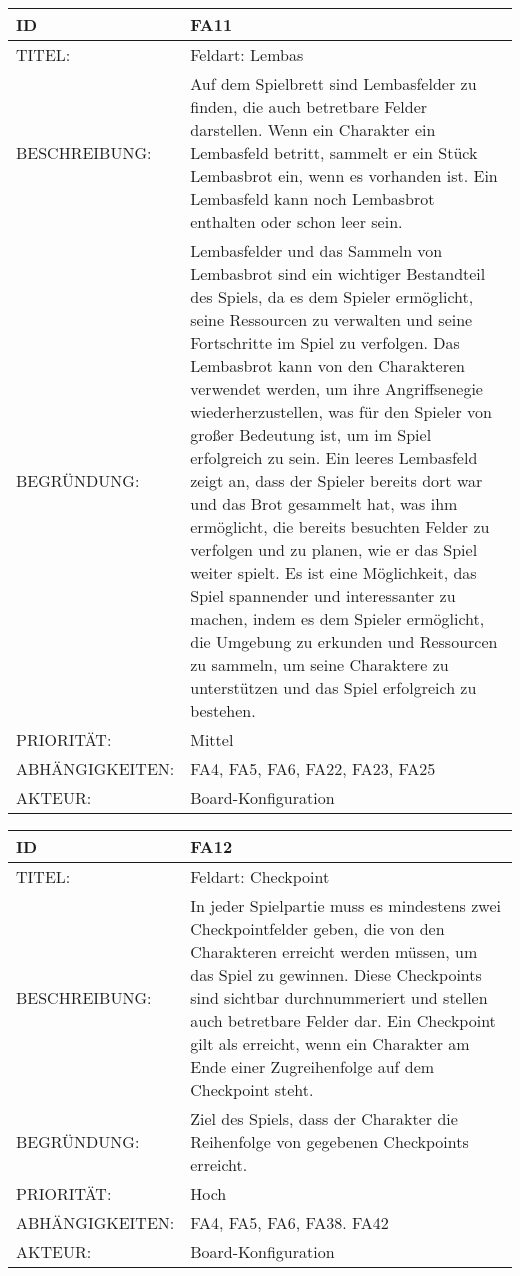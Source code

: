 \documentclass{uulm-assignment}
\begin{document}
    \begin{tabularx}{\textwidth}{|l|X |} \hline
        \textbf{ID} & \textbf{FA11} \\
        \hline
        TITEL: &  Feldart: Lembas\\
        \hline
        BESCHREIBUNG: & Auf dem Spielbrett sind Lembasfelder zu finden, die auch betretbare Felder darstellen. Wenn ein Charakter ein Lembasfeld betritt, sammelt er ein Stück
Lembasbrot ein, wenn es vorhanden ist. Ein Lembasfeld kann noch Lembasbrot enthalten
oder schon leer sein.
        \\
        \hline
        BEGRÜNDUNG: & Lembasfelder und das Sammeln von Lembasbrot sind ein wichtiger Bestandteil des Spiels, da es dem Spieler ermöglicht, seine Ressourcen zu verwalten und seine Fortschritte im Spiel zu verfolgen. Das Lembasbrot kann von den Charakteren verwendet werden, um ihre Angriffsenegie wiederherzustellen, was für den Spieler von großer Bedeutung ist, um im Spiel erfolgreich zu sein. Ein leeres Lembasfeld zeigt an, dass der Spieler bereits dort war und das Brot gesammelt hat, was ihm ermöglicht, die bereits besuchten Felder zu verfolgen und zu planen, wie er das Spiel weiter spielt.
Es ist eine Möglichkeit, das Spiel spannender und interessanter zu machen, indem es dem Spieler ermöglicht, die Umgebung zu erkunden und Ressourcen zu sammeln, um seine Charaktere zu unterstützen und das Spiel erfolgreich zu bestehen.\\
        \hline
        PRIORITÄT: & Mittel\\
        \hline
        ABHÄNGIGKEITEN: & FA4, FA5, FA6, FA22, FA23, FA25\\
        \hline
        AKTEUR: & Board-Konfiguration\\
        \hline
    \end{tabularx}
    
    \begin{tabularx}{\textwidth}{|l|X |} \hline
        \textbf{ID} & \textbf{FA12} \\
        \hline
        TITEL: &  Feldart: Checkpoint\\
        \hline
        BESCHREIBUNG: & In jeder Spielpartie muss es mindestens zwei Checkpointfelder geben, die von den Charakteren erreicht werden müssen, um das Spiel zu gewinnen. Diese
Checkpoints sind sichtbar durchnummeriert und stellen auch betretbare Felder dar.
Ein Checkpoint gilt als erreicht, wenn ein Charakter am Ende einer Zugreihenfolge
auf dem Checkpoint steht.
        \\
        \hline
        BEGRÜNDUNG: & Ziel des Spiels, dass der Charakter die Reihenfolge von gegebenen Checkpoints erreicht.
        \\
        \hline
        PRIORITÄT: & Hoch\\
        \hline
        ABHÄNGIGKEITEN: & FA4, FA5, FA6, FA38. FA42\\
        \hline
        AKTEUR: & Board-Konfiguration \\
        \hline
    \end{tabularx}
    
\end{document}
